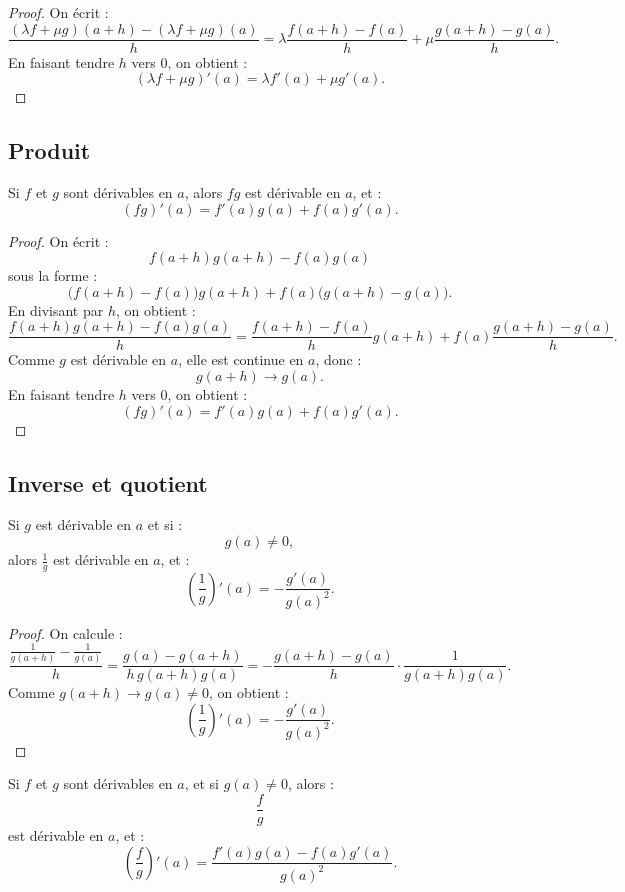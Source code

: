 \documentclass[11pt,a4paper]{article}
\begin{document}
\begin{proof}
On écrit :
\[
\frac{(\lambda f+\mu g)(a+h)-(\lambda f+\mu g)(a)}{h}
=
\lambda\frac{f(a+h)-f(a)}{h}
+
\mu\frac{g(a+h)-g(a)}{h}.
\]
En faisant tendre \(h\) vers \(0\), on obtient :
\[
(\lambda f+\mu g)'(a)=\lambda f'(a)+\mu g'(a).
\]
\end{proof}

\subsection{Produit}

\begin{theorembox}
Si \(f\) et \(g\) sont dérivables en \(a\), alors \(fg\) est dérivable en \(a\), et :
\[
(fg)'(a)=f'(a)g(a)+f(a)g'(a).
\]
\end{theorembox}

\begin{proof}
On écrit :
\[
f(a+h)g(a+h)-f(a)g(a)
\]
sous la forme :
\[
\bigl(f(a+h)-f(a)\bigr)g(a+h)
+
f(a)\bigl(g(a+h)-g(a)\bigr).
\]
En divisant par \(h\), on obtient :
\[
\frac{f(a+h)g(a+h)-f(a)g(a)}{h}
=
\frac{f(a+h)-f(a)}{h}g(a+h)
+
f(a)\frac{g(a+h)-g(a)}{h}.
\]
Comme \(g\) est dérivable en \(a\), elle est continue en \(a\), donc :
\[
g(a+h)\to g(a).
\]
En faisant tendre \(h\) vers \(0\), on obtient :
\[
(fg)'(a)=f'(a)g(a)+f(a)g'(a).
\]
\end{proof}

\subsection{Inverse et quotient}

\begin{theorembox}
Si \(g\) est dérivable en \(a\) et si :
\[
g(a)\neq0,
\]
alors \(\frac1g\) est dérivable en \(a\), et :
\[
\left(\frac1g\right)'(a)=-\frac{g'(a)}{g(a)^2}.
\]
\end{theorembox}

\begin{proof}
On calcule :
\[
\frac{\frac1{g(a+h)}-\frac1{g(a)}}{h}
=
\frac{g(a)-g(a+h)}{h\,g(a+h)g(a)}
=
-\frac{g(a+h)-g(a)}{h}\cdot\frac1{g(a+h)g(a)}.
\]
Comme \(g(a+h)\to g(a)\neq0\), on obtient :
\[
\left(\frac1g\right)'(a)=-\frac{g'(a)}{g(a)^2}.
\]
\end{proof}

\begin{theorembox}
Si \(f\) et \(g\) sont dérivables en \(a\), et si \(g(a)\neq0\), alors :
\[
\frac fg
\]
est dérivable en \(a\), et :
\[
\left(\frac fg\right)'(a)
=
\frac{f'(a)g(a)-f(a)g'(a)}{g(a)^2}.
\]
\end{theorembox}
\end{document}

